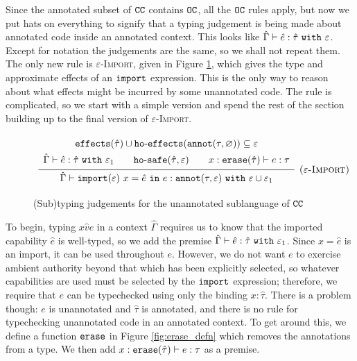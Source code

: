 Since the annotated subset of $\mathtt{CC}$ contains $\mathtt{OC}$, all the $\mathtt{OC}$ rules apply, but now we put hats on everything to signify that a typing judgement is being made about annotated code inside an annotated context. This looks like $\hat \Gamma \vdash \hat e: \hat \tau~\mathtt{with}~ \varepsilon$. Except for notation the judgements are the same, so we shall not repeat them. The only new rule is \textsc{$\varepsilon$-Import}, given in Figure \ref{fig:import_rule}, which gives the type and approximate effects of an $\mathtt{import}$ expression. This is the only way to reason about what effects might be incurred by some unannotated code. The rule is complicated, so we start with a simple version and spend the rest of the section building up to the final version of \textsc{$\varepsilon$-Import}.

\begin{figure}[h]
\vspace{-5pt}

\[
\begin{array}{c}

\infer[\textsc{($\varepsilon$-Import)}]
	{ \hat \Gamma \vdash \kwa{import}(\varepsilon)~x = \hat e~\kw{in} e: \kwa{annot}(\tau, \varepsilon)~\kw{with} \varepsilon \cup \varepsilon_1 }
{{\def\arraystretch{1.4}
  \begin{array}{c}
\kwa{effects}(\hat \tau) \cup \hofx{\annot{\tau}{\varnothing}}\subseteq \varepsilon \\
\hat \Gamma \vdash \hat e: \hat \tau~\kw{with} \varepsilon_1 ~~~~~~ \kwa{ho \hyphen safe}(\hat \tau, \varepsilon) ~~~~~~ x: \kwa{erase}(\hat \tau) \vdash e: \tau
  \end{array}}} 
 
\end{array}
\]
\vspace{-7pt}
\caption{(Sub)typing judgements for the unannotated sublanguage of $\mathtt{CC}$}
\label{fig:import_rule}
\end{figure}

To begin, typing ${x}{\hat v}{e}$ in a context $\hat \Gamma$ requires us to know that the imported capability $\hat e$ is well-typed, so we add the premise $\hat \Gamma \vdash \hat e: \hat \tau~\mathtt{with}~ \varepsilon_1$. Since $x = \hat e$ is an import, it can be used throughout $e$. However, we do not want $e$ to exercise ambient authority beyond that which has been explicitly selected, so whatever capabilities are used must be selected by the $\mathtt{import}$ expression; therefore, we require that $e$ can be typechecked using only the binding $x: \hat \tau$. There is a problem though: $e$ is unannotated and $\hat \tau$ is annotated, and there is no rule for typechecking unannotated code in an annotated context. To get around this, we define a function $\mathtt{erase}$ in Figure \ref{fig:erase_defn} which removes the annotations from a type. We then add $x: \mathtt{erase}(\hat \tau) \vdash e: \tau$ as a premise.

